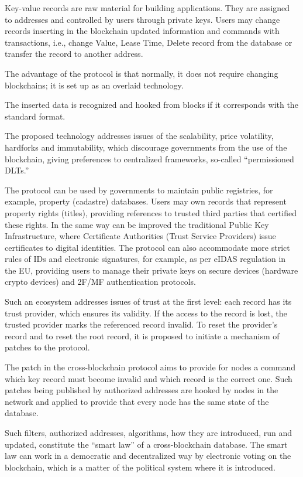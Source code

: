 \begin{multicols}{2}
Key-value records are raw material for building applications. They are assigned to addresses and controlled by users through private keys. Users may change records inserting in the blockchain updated information and commands with transactions, i.e., change Value, Lease Time, Delete record from the database or transfer the record to another address.

The advantage of the protocol is that normally, it does not require changing blockchains; it is set up as an overlaid technology.

The inserted data is recognized and hooked from blocks if it corresponds with the standard format. 

The proposed technology addresses issues of the scalability, price volatility, hardforks and immutability, which discourage governments from the use of the blockchain, giving preferences to centralized frameworks, so-called “permissioned DLTs.” 

The protocol can be used by governments to maintain public registries, for example, property (cadastre) databases. Users may own records that represent property rights (titles), providing references to trusted third parties that certified these rights. In the same way can be improved the traditional Public Key Infrastructure, where Certificate Authorities (Trust Service Providers) issue certificates to digital identities. The protocol can also accommodate more strict rules of IDs and electronic signatures, for example, as per eIDAS regulation in the EU, providing users to manage their private keys on secure devices (hardware crypto devices) and 2F/MF authentication protocols.

Such an ecosystem addresses issues of trust at the first level: each record has its trust provider, which ensures its validity. If the access to the record is lost, the trusted provider marks the referenced record invalid. To reset the provider’s record and to reset the root record, it is proposed to initiate a mechanism of patches to the protocol. 

The patch in the cross-blockchain protocol aims to provide for nodes a command which key record must become invalid and which record is the correct one. Such patches being published by authorized addresses are hooked by nodes in the network and applied to provide that every node has the same state of the database.

Such filters, authorized addresses, algorithms, how they are introduced, run and updated, constitute the “smart law” of a cross-blockchain database. The smart law can work in a democratic and decentralized way by electronic voting on the blockchain, which is a matter of the political system where it is introduced.


\end{multicols}
